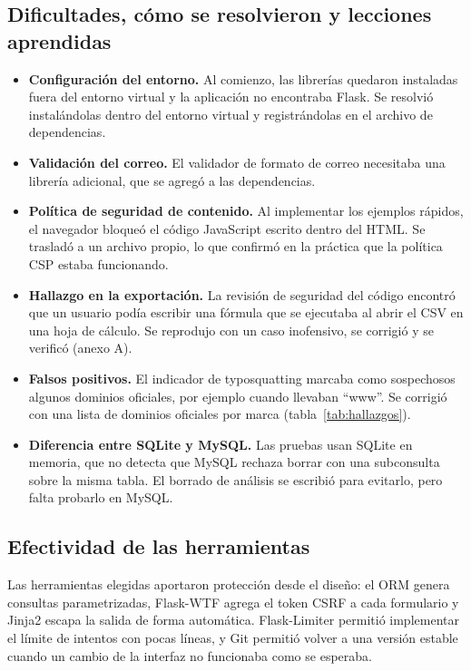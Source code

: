 \documentclass[journal,onecolumn,12pt,draftclsnofoot]{IEEEtran}
\begin{document}
\subsection{Dificultades, cómo se resolvieron y lecciones aprendidas}

\begin{itemize}
  \item \textbf{Configuración del entorno.} Al comienzo, las librerías quedaron instaladas fuera del entorno virtual y la aplicación no encontraba Flask. Se resolvió instalándolas dentro del entorno virtual y registrándolas en el archivo de dependencias.
  \item \textbf{Validación del correo.} El validador de formato de correo necesitaba una librería adicional, que se agregó a las dependencias.
  \item \textbf{Política de seguridad de contenido.} Al implementar los ejemplos rápidos, el navegador bloqueó el código JavaScript escrito dentro del HTML. Se trasladó a un archivo propio, lo que confirmó en la práctica que la política CSP estaba funcionando.
  \item \textbf{Hallazgo en la exportación.} La revisión de seguridad del código encontró que un usuario podía escribir una fórmula que se ejecutaba al abrir el CSV en una hoja de cálculo. Se reprodujo con un caso inofensivo, se corrigió y se verificó (anexo A).
  \item \textbf{Falsos positivos.} El indicador de typosquatting marcaba como sospechosos algunos dominios oficiales, por ejemplo cuando llevaban ``www''. Se corrigió con una lista de dominios oficiales por marca (tabla~\ref{tab:hallazgos}).
  \item \textbf{Diferencia entre SQLite y MySQL.} Las pruebas usan SQLite en memoria, que no detecta que MySQL rechaza borrar con una subconsulta sobre la misma tabla. El borrado de análisis se escribió para evitarlo, pero falta probarlo en MySQL.
\end{itemize}

\subsection{Efectividad de las herramientas}

Las herramientas elegidas aportaron protección desde el diseño: el ORM genera consultas parametrizadas, Flask-WTF agrega el token CSRF a cada formulario y Jinja2 escapa la salida de forma automática. Flask-Limiter permitió implementar el límite de intentos con pocas líneas, y Git permitió volver a una versión estable cuando un cambio de la interfaz no funcionaba como se esperaba.
\end{document}
